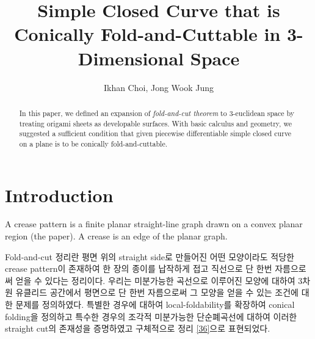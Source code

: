 \documentclass{amsart}
\theoremstyle{plain}
\theoremstyle{definition}
\theoremstyle{remark}
\begin{document}
\title[Fold-and-Cuttable Pattern]
{Simple Closed Curve that is Conically Fold-and-Cuttable in 3-Dimensional Space}

\author[I. Choi, J. W. Jung]{Ikhan Choi, Jong Wook Jung}
\address{address}















\begin{abstract}
\iffalse
기초적 미적분학, 기하학에 의한 증명
\fi
In this paper, we defined an expansion of {\it fold-and-cut theorem} to 3-euclidean space by treating origami sheets as developable surfaces.
With basic calculus and geometry, we suggested a sufficient condition that given piecewise differentiable simple closed curve on a plane is to be conically fold-and-cuttable.

\end{abstract}

\maketitle

\section{Introduction}
\iffalse
-오리가미 분야소개

-주제에 대한 간략한 소개
크리즈패턴과 폴드컷정리
정리스테이트

-배경지식

로컬 폴더빌리티와 글로벌 폴더빌리티
폴더빌리티 :
 마에카와 : 엠-브이=2
 카와사키 : 180도
 두 낫 페네트레이트, 관통규칙

공간으로의 확장 : 접는 함수를 생각할 수 있다. 공간에서도 관통규칙을 그대로 생각해볼 수 있다.

데벨로퍼블 분류 : (렘마)

까지


-인 섹션 왓
\fi

A crease pattern is a finite planar straight-line graph drawn on a convex planar region (the paper). A crease is an edge of the planar graph.

Fold-and-cut 정리란 평면 위의 straight side로 만들어진 어떤 모양이라도 적당한 crease pattern이 존재하여 한 장의 종이를 납작하게 접고 직선으로 단 한번 자름으로써 얻을 수 있다는 정리이다.
우리는 미분가능한 곡선으로 이루어진 모양에 대하여 3차원 유클리드 공간에서 평면으로 단 한번 자름으로써 그 모양을 얻을 수 있는 조건에 대한 문제를 정의하였다.
특별한 경우에 대하여 local-foldability를 확장하여 conical folding을 정의하고 특수한 경우의 조각적 미분가능한 단순폐곡선에 대하여 이러한 straight cut의 존재성을 증명하였고 구체적으로 정리 \ref{36}으로 표현되었다.
\end{document}
